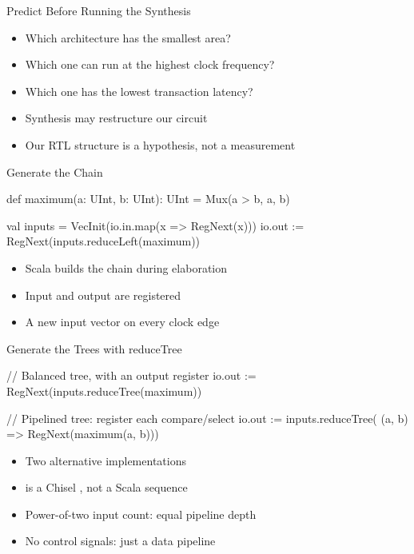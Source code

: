 \begin{frame}{Predict Before Running the Synthesis}
\begin{itemize}
\item Which architecture has the smallest area?
\item Which one can run at the highest clock frequency?
\item Which one has the lowest transaction latency?
\item Synthesis may restructure our circuit
\item Our RTL structure is a hypothesis, not a measurement
\end{itemize}
\end{frame}

\begin{frame}[fragile]{Generate the Chain}

\begin{chisel}
def maximum(a: UInt, b: UInt): UInt =
  Mux(a > b, a, b)

val inputs = VecInit(io.in.map(x => RegNext(x)))
io.out := RegNext(inputs.reduceLeft(maximum))
\end{chisel}
\begin{itemize}
\item Scala builds the chain during elaboration
\item Input and output are registered
\item A new input vector on every clock edge
\end{itemize}
\end{frame}

\begin{frame}[fragile]{Generate the Trees with reduceTree}
\begin{chisel}
// Balanced tree, with an output register
io.out := RegNext(inputs.reduceTree(maximum))

// Pipelined tree: register each compare/select
io.out := inputs.reduceTree(
  (a, b) => RegNext(maximum(a, b)))
\end{chisel}
\begin{itemize}
\item Two alternative implementations
\item {} is a Chisel , not a Scala sequence
\item Power-of-two input count: equal pipeline depth
\item No control signals: just a data pipeline
\end{itemize}
\end{frame}



